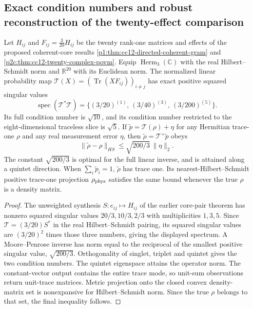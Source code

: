 \documentclass[12pt,a4paper]{article}
\begin{document}
\subsection{Exact condition numbers and robust reconstruction of the twenty-effect comparison}
\label{p2c:sec:cc16-directed-tomography-stability}
\begin{theorem}
\label{p2c:thm:cc16-directed-tomography-stability}
Let $H_{ij}$ and $F_{ij}=\frac3{20}H_{ij}$ be the twenty
rank-one matrices and effects of the proposed coherent-core results
\ref{p1:thm:cc12-directed-coherent-gram} and
\ref{p2c:thm:cc12-twenty-complex-povm}.
Equip $\operatorname{Herm}_3(\mathbb C)$ with the real
Hilbert--Schmidt norm and $\mathbb R^{20}$ with its Euclidean norm.
The normalized linear probability map
$\mathcal T(X)=(\operatorname{Tr}(XF_{ij}))_{i\ne j}$
has exact positive squared singular values
\[
 \boxed{\operatorname{spec}(\mathcal T^*\mathcal T)
 =\{(3/20)^{(1)},\,(3/40)^{(3)},\,(3/200)^{(5)}\}.}
\]
Its full condition number is $\sqrt{10}$, and its condition
number restricted to the eight-dimensional traceless slice is
$\sqrt5$. If $\tilde p=\mathcal T(\rho)+\eta$ for any Hermitian
trace-one $\rho$ and any real measurement error $\eta$, then
$\tilde\rho=\mathcal T^+\tilde p$ obeys
\[
 \boxed{\|\tilde\rho-\rho\|_{HS}\le
 \sqrt{200/3}\,\|\eta\|_2.}
\]
The constant $\sqrt{200/3}$ is optimal for the full linear inverse,
and is attained along a quintet direction. When $\sum_i\tilde p_i=1$,
$\tilde\rho$ has trace one. Its nearest-Hilbert--Schmidt
positive trace-one projection $\rho_{\rm phys}$ satisfies the same
bound whenever the true $\rho$ is a density matrix.
\end{theorem}
\begin{proof}
The unweighted synthesis $S:e_{ij}\mapsto H_{ij}$ of the earlier
core-pair theorem has nonzero squared singular values
$20/3,10/3,2/3$ with multiplicities $1,3,5$. Since
$\mathcal T=(3/20)S^*$ in the real Hilbert--Schmidt pairing,
its squared singular values are $(3/20)^2$ times those three
numbers, giving the displayed spectrum. A Moore--Penrose inverse
has norm equal to the reciprocal of the smallest positive singular
value, $\sqrt{200/3}$. Orthogonality of singlet, triplet and
quintet gives the two condition numbers. The quintet eigenspace
attains the operator norm. The constant-vector output contains the
entire trace mode, so unit-sum observations return unit-trace matrices.
Metric projection onto the closed convex density-matrix set is
nonexpansive for Hilbert--Schmidt norm. Since the true $\rho$ belongs
to that set, the final inequality follows.
\end{proof}
\end{document}
